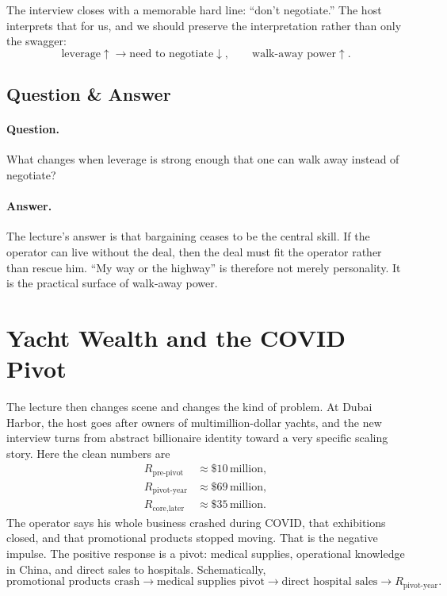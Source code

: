 The interview closes with a memorable hard line: ``don't negotiate.'' The host interprets that for us, and we should preserve the interpretation rather than only the swagger:
\begin{equation}
\text{leverage}\uparrow \to \text{need to negotiate}\downarrow,
\qquad
\text{walk-away power}\uparrow.
\end{equation}

\subsection{Question \& Answer}

\paragraph{Question.} What changes when leverage is strong enough that one can walk away instead of negotiate?

\paragraph{Answer.} The lecture's answer is that bargaining ceases to be the central skill. If the operator can live without the deal, then the deal must fit the operator rather than rescue him. ``My way or the highway'' is therefore not merely personality. It is the practical surface of walk-away power.

\section{Yacht Wealth and the COVID Pivot}

The lecture then changes scene and changes the kind of problem. At Dubai Harbor, the host goes after owners of multimillion-dollar yachts, and the new interview turns from abstract billionaire identity toward a very specific scaling story. Here the clean numbers are
\begin{align}
R_{\text{pre-pivot}} &\approx \$10\,\text{million}, \\
R_{\text{pivot-year}} &\approx \$69\,\text{million}, \\
R_{\text{core,later}} &\approx \$35\,\text{million}.
\end{align}
The operator says his whole business crashed during COVID, that exhibitions closed, and that promotional products stopped moving. That is the negative impulse. The positive response is a pivot: medical supplies, operational knowledge in China, and direct sales to hospitals. Schematically,
\begin{equation}
\text{promotional products crash}
\to
\text{medical supplies pivot}
\to
\text{direct hospital sales}
\to
R_{\text{pivot-year}}.
\end{equation}

